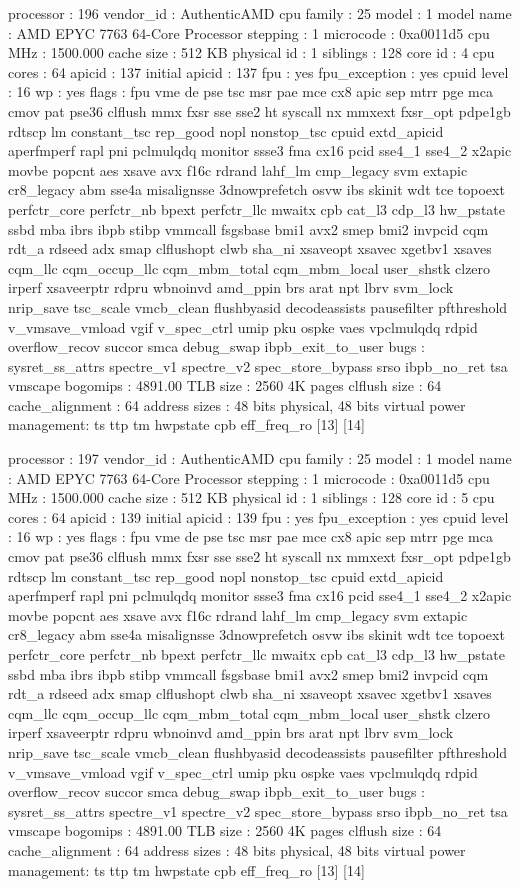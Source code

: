 processor	: 196
vendor_id	: AuthenticAMD
cpu family	: 25
model		: 1
model name	: AMD EPYC 7763 64-Core Processor
stepping	: 1
microcode	: 0xa0011d5
cpu MHz		: 1500.000
cache size	: 512 KB
physical id	: 1
siblings	: 128
core id		: 4
cpu cores	: 64
apicid		: 137
initial apicid	: 137
fpu		: yes
fpu_exception	: yes
cpuid level	: 16
wp		: yes
flags		: fpu vme de pse tsc msr pae mce cx8 apic sep mtrr pge mca cmov pat pse36 clflush mmx fxsr sse sse2 ht syscall nx mmxext fxsr_opt pdpe1gb rdtscp lm constant_tsc rep_good nopl nonstop_tsc cpuid extd_apicid aperfmperf rapl pni pclmulqdq monitor ssse3 fma cx16 pcid sse4_1 sse4_2 x2apic movbe popcnt aes xsave avx f16c rdrand lahf_lm cmp_legacy svm extapic cr8_legacy abm sse4a misalignsse 3dnowprefetch osvw ibs skinit wdt tce topoext perfctr_core perfctr_nb bpext perfctr_llc mwaitx cpb cat_l3 cdp_l3 hw_pstate ssbd mba ibrs ibpb stibp vmmcall fsgsbase bmi1 avx2 smep bmi2 invpcid cqm rdt_a rdseed adx smap clflushopt clwb sha_ni xsaveopt xsavec xgetbv1 xsaves cqm_llc cqm_occup_llc cqm_mbm_total cqm_mbm_local user_shstk clzero irperf xsaveerptr rdpru wbnoinvd amd_ppin brs arat npt lbrv svm_lock nrip_save tsc_scale vmcb_clean flushbyasid decodeassists pausefilter pfthreshold v_vmsave_vmload vgif v_spec_ctrl umip pku ospke vaes vpclmulqdq rdpid overflow_recov succor smca debug_swap ibpb_exit_to_user
bugs		: sysret_ss_attrs spectre_v1 spectre_v2 spec_store_bypass srso ibpb_no_ret tsa vmscape
bogomips	: 4891.00
TLB size	: 2560 4K pages
clflush size	: 64
cache_alignment	: 64
address sizes	: 48 bits physical, 48 bits virtual
power management: ts ttp tm hwpstate cpb eff_freq_ro [13] [14]

processor	: 197
vendor_id	: AuthenticAMD
cpu family	: 25
model		: 1
model name	: AMD EPYC 7763 64-Core Processor
stepping	: 1
microcode	: 0xa0011d5
cpu MHz		: 1500.000
cache size	: 512 KB
physical id	: 1
siblings	: 128
core id		: 5
cpu cores	: 64
apicid		: 139
initial apicid	: 139
fpu		: yes
fpu_exception	: yes
cpuid level	: 16
wp		: yes
flags		: fpu vme de pse tsc msr pae mce cx8 apic sep mtrr pge mca cmov pat pse36 clflush mmx fxsr sse sse2 ht syscall nx mmxext fxsr_opt pdpe1gb rdtscp lm constant_tsc rep_good nopl nonstop_tsc cpuid extd_apicid aperfmperf rapl pni pclmulqdq monitor ssse3 fma cx16 pcid sse4_1 sse4_2 x2apic movbe popcnt aes xsave avx f16c rdrand lahf_lm cmp_legacy svm extapic cr8_legacy abm sse4a misalignsse 3dnowprefetch osvw ibs skinit wdt tce topoext perfctr_core perfctr_nb bpext perfctr_llc mwaitx cpb cat_l3 cdp_l3 hw_pstate ssbd mba ibrs ibpb stibp vmmcall fsgsbase bmi1 avx2 smep bmi2 invpcid cqm rdt_a rdseed adx smap clflushopt clwb sha_ni xsaveopt xsavec xgetbv1 xsaves cqm_llc cqm_occup_llc cqm_mbm_total cqm_mbm_local user_shstk clzero irperf xsaveerptr rdpru wbnoinvd amd_ppin brs arat npt lbrv svm_lock nrip_save tsc_scale vmcb_clean flushbyasid decodeassists pausefilter pfthreshold v_vmsave_vmload vgif v_spec_ctrl umip pku ospke vaes vpclmulqdq rdpid overflow_recov succor smca debug_swap ibpb_exit_to_user
bugs		: sysret_ss_attrs spectre_v1 spectre_v2 spec_store_bypass srso ibpb_no_ret tsa vmscape
bogomips	: 4891.00
TLB size	: 2560 4K pages
clflush size	: 64
cache_alignment	: 64
address sizes	: 48 bits physical, 48 bits virtual
power management: ts ttp tm hwpstate cpb eff_freq_ro [13] [14]

